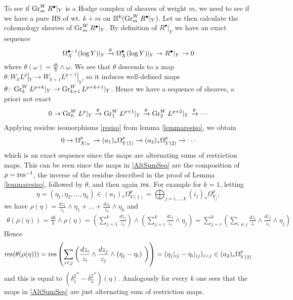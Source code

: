 \documentclass[../main.tex]{subfiles}
\begin{document}
To see if $\operatorname{Gr}_m^W R^\bullet|_Y$ is a Hodge complex of sheaves of weight $m$, we need to see if we have a pure HS of wt. $k+m$ on  $\mathbb{H}^k(\operatorname{Gr}_m^W R^\bullet|_Y)$.
Let us then calculate the cohomology sheaves of  $\operatorname{Gr}_m^W R^\bullet|_Y$. By definition of $R^\bullet|_Y$ we have an exact sequence 
\[
\Omega^{\bullet-1}_{{X}}(\log Y)|_{Y} \xrightarrow{\theta}  \Omega^{\bullet}_{{X}}(\log Y)|_{Y} \twoheadrightarrow  R^\bullet|_Y \to 0
\]
where $\theta(\omega)=\frac{db}{b} \wedge \omega$. We see that $\theta$ descends to a map $\theta \colon W_k L^p|_Y \to W_{k+1} L^{p+1}|_Y $, so it induces well-defined maps $\theta \colon \operatorname{Gr}^W_k L^{p+k}|_Y \to \operatorname{Gr}^W_{k+1} L^{p+k+1}|_Y $. Hence we have a sequence of sheaves, a priori not exact
\begin{align}
0 \to \operatorname{Gr}^W_0 L^{p}|_Y \xrightarrow{\theta}  \operatorname{Gr}^W_1 L^{p+1}|_Y \xrightarrow{\theta}  \operatorname{Gr}^W_2 L^{p+2}|_Y \xrightarrow{\theta} \cdots \label{GrSeq}
\end{align}
Applying residue isomorphisms \eqref{resiso} from lemma \ref{lemmaresiso}, we obtain 
\begin{align}
0 \to \Omega^p_{X|_Y} \to (a_1)_* \Omega^p_{Y(1)} \to (a_2)_* \Omega^p_{Y(2)} \to \cdots  \label{AltSumSeq}
\end{align}
which is an exact sequence since the maps are alternating sums of restriction maps.
This can be seen since the maps in \eqref{AltSumSeq} are the composition of $\rho = \operatorname{res}^{-1}$, the inverse of the residue described in the proof of Lemma \ref{lemmaresiso}, followed by $\theta$, and then again $\operatorname{res}$. For example for $k=1$, letting
\[
\eta = (\eta_1, \eta_2, \dots, \eta_k ) \in (a_1)_*\Omega^p_{Y(1)} = \bigoplus_{j=i, \dots, k} (i_j)_*\Omega^p_{Y_j},
\]
we have $\rho(\eta) = \frac{dz_1}{z_1} \wedge \eta_1 + \dots + \frac{dz_k}{z_k} \wedge \eta_k$ and
\begin{align*}
 \theta(\rho(\eta)) = \frac{db}{b} \wedge \rho(\eta) = \left( \sum_{j=1}^k \frac{dz_j}{z_j} \right) \wedge \left( \sum_{j=i}^k \frac{dz_j}{z_j} \wedge \eta_j \right) =  \sum_{j=i}^k \left(  \sum_{i \neq j} \frac{dz_i}{z_i} \wedge \frac{dz_j}{z_j} \wedge \eta_j   \right)
\end{align*}
Hence
\begin{align*}
    \res( \theta(\rho(\eta))) = \res \left( \sum_{i < j} \left( \frac{dz_i}{z_i} \wedge \frac{dz_j}{z_j} \wedge (\eta_j - \eta_i) \ \right)   \right) = ( \eta_j|_{ij} - \eta_i|_{ij} )_{i<j} \in  (a_2)_* \Omega^p_{Y(2)}
\end{align*}
and this is equal to $({\delta_1^2}^* - {\delta_2^2}^*)(\eta)$. Analogously for every $k$ one sees that the maps in \eqref{AltSumSeq} are just alternating sum of restriction maps.
\end{document}
